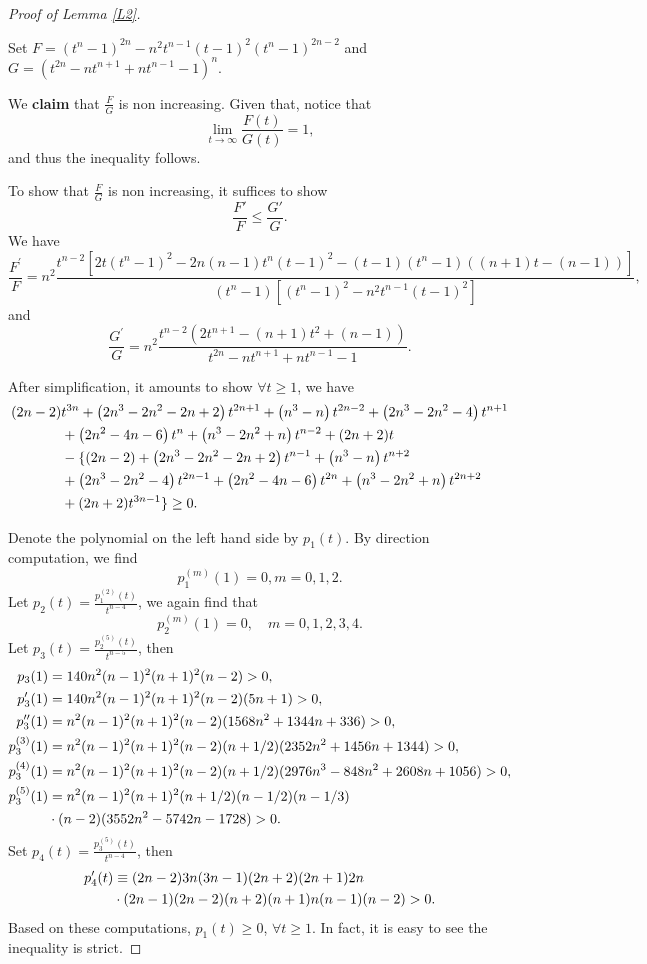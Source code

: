 \documentclass[10pt,a4paper]{amsart}
\begin{document}
\begin{proof}[Proof of Lemma \ref{L2}]
\ 

Set $F=\left(t^n-1\right)^{2 n}-n^2 t^{n-1}(t-1)^2\left(t^n-1\right)^{2 n-2}$ and $
G=\left(t^{2 n}-n t^{n+1}+n t^{n-1}-1\right)^n$.

We \textbf{claim} that $\frac{F}{G}$ is non increasing. Given that, notice that 
\[
\lim_{t\to \infty} \frac{F(t)}{G(t)}=1,
\]
and thus the inequality follows. 

To show that $\frac{F}{G}$ is non increasing, it suffices to show 
\[
\frac{F'}{F}\leq \frac{G'}{G}.
\]
We have
\[
\frac{F^{\prime}}{F}=n^2 \frac{t^{n-2}\left[2 t\left(t^n-1\right)^2-2 n(n-1) t^n(t-1)^2-(t-1)\left(t^n-1\right)((n+1) t-(n-1))\right]}{\left(t^n-1\right)\left[\left(t^n-1\right)^2-n^2 t^{n-1}(t-1)^2\right]},
\]
and
\[
\frac{G^{\prime}}{G}=n^2 \frac{t^{n-2}\left(2 t^{ n+1}-(n+1) t^2+(n-1) \right)}{t^{2 n}-n t^{n+1}+n t^{n-1}-1}.
\]

After simplification, it amounts to show $\forall t \geq 1$, we have 
\begin{align} \notag
(2 n-2)  &t^{3 n}+\left(2 n^3-2 n^2-2 n+2\right) t^{2 n+1}+\left(n^3-n\right) t^{2 n-2}+\left(2 n^3-2 n^2-4\right) t^{n+1} \\ \notag
& +\left(2 n^2-4 n-6\right) t^n+\left(n^3-2 n^2+n\right) t^{n-2}+(2 n+2) t \\\notag
& -\{ (2 n-2)+\left(2 n^3-2 n^2-2 n+2\right) t^{n-1}+\left(n^3-n\right) t^{n+2} \\\notag
& +\left(2 n^3-2 n^2-4\right) t^{2 n-1}+\left(2 n^2-4 n-6\right) t^{2 n}+\left(n^3-2 n^2+n\right) t^{2 n+2} \\ \notag
& +(2 n+2) t^{3 n-1} \}\geq 0.
\end{align}

Denote the polynomial on the left hand side by $p_1(t)$.  By direction computation, we find 
\[
p_1^{(m)}(1)=0, m=0,1,2.
\]
Let $p_2(t)=\frac{p_1^{(2)}(t)}{t^{n-4}}$, we again find that 
\[
p_2^{(m)}(1)=0, \quad m=0, 1, 2, 3, 4. 
\]
Let $p_3(t)=\frac{p_2^{(5)}(t)}{t^{n-5}}$, then 
\begin{align} \notag 
p_3(1)&=140n^2 (n-1)^2 (n+1)^2 (n-2)>0, \\ \notag
p_3'(1)&=140n^2 (n-1)^2 (n+1)^2 (n-2)(5n+1)>0, \\ \notag
p_3''(1)&=n^2 (n-1)^2 (n+1)^2 (n-2)(1568n^2+1344n+336)>0, \\ \notag
p_3^{(3)}(1)&=n^2 (n-1)^2 (n+1)^2 (n-2)(n+1/2)(2352n^2+1456n+1344)>0, \\ \notag
p_3^{(4)}(1)&=n^2 (n-1)^2 (n+1)^2 (n-2)(n+1/2)(2976n^3-848n^2+2608n+1056)>0, \\ \notag
p_3^{(5)}(1)&=n^2 (n-1)^2 (n+1)^2 (n+1/2)(n-1/2)(n-1/3) \\ \notag
& \cdot (n-2)(3552n^2-5742n-1728)>0.
\end{align}
Set $p_4(t)=\frac{p_3^{(5)}(t)}{t^{n-4}}$, then 
\begin{align} \notag 
p_4'(t)&\equiv (2n-2)3n(3n-1)(2n+2)(2n+1)2n\\ \notag
 &\cdot (2n-1)(2n-2)(n+2)(n+1)n(n-1)(n-2)>0.
\end{align}
Based on these computations, $p_1(t)\geq 0$, $\forall t\geq 1$. In fact, it is easy to see the inequality is strict. 


\end{proof}
\end{document}
